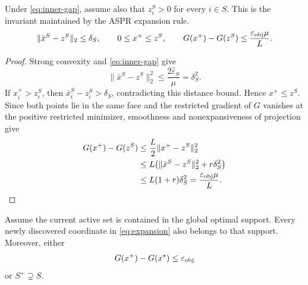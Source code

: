 \documentclass[11pt]{article}
\begin{document}
\begin{lemma}
\label{lem:retraction}
Under \cref{eq:inner-gap}, assume also that $z_i^S>0$ for every $i\in S$.
This is the invariant maintained by the ASPR expansion rule.
\begin{equation}
 \|\bar x^S-z^S\|_2\leq\delta_S,
 \qquad
 0\leq x^+\leq z^S,
 \qquad
 G(x^+)-G(z^S)\leq\frac{\varepsilon_{\rm obj}\mu}{L}.
 \label{eq:retraction-properties}
\end{equation}
\end{lemma}

\begin{proof}
Strong convexity and \cref{eq:inner-gap} give
\[
 \|\bar x^S-z^S\|_2^2
 \leq\frac{2\widehat\varepsilon_S}{\mu}
 =\delta_S^2.
\]
If $x_i^+>z_i^S$, then
$\bar x_i^S-z_i^S>\delta_S$, contradicting this distance bound.  Hence
$x^+\leq z^S$.  Since both points lie in the same face and the restricted
gradient of $G$ vanishes at the positive restricted minimizer, smoothness and
nonexpansiveness of projection give
\begin{align*}
 G(x^+)-G(z^S)
 &\leq\frac L2\|x^+-z^S\|_2^2\\
 &\leq L\bigl(\|\bar x^S-z^S\|_2^2+r\delta_S^2\bigr)\\
 &\leq L(1+r)\delta_S^2
 =\frac{\varepsilon_{\rm obj}\mu}{L}.
\end{align*}
\end{proof}

\begin{lemma}
\label{lem:safe-progress}
Assume the current active set is contained in the global optimal support.
Every newly discovered coordinate in \cref{eq:expansion} also belongs to that
support.  Moreover, either
\begin{equation}
 G(x^+)-G(x^\star)\leq\varepsilon_{\rm obj}
 \label{eq:accurate-alternative}
\end{equation}
or $S^+\supsetneq S$.
\end{lemma}
\end{document}
